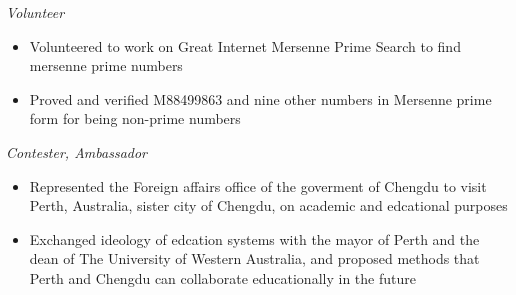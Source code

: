 \documentclass{resume}
\begin{document}
\emph{Volunteer}
\begin{itemize}
  \item Volunteered to work on Great Internet Mersenne Prime Search to find mersenne prime numbers
  \item Proved and verified M88499863 and nine other numbers in Mersenne prime form for being non-prime numbers
\end{itemize}

\emph{Contester, Ambassador}
\begin{itemize}
  \item Represented the Foreign affairs office of the goverment of Chengdu to visit Perth, Australia, sister city of Chengdu, on academic and edcational purposes
  \item Exchanged ideology of edcation systems with the mayor of Perth and the dean of The University of Western Australia, and proposed methods that Perth and Chengdu can collaborate educationally in the future
\end{itemize}
\end{document}

